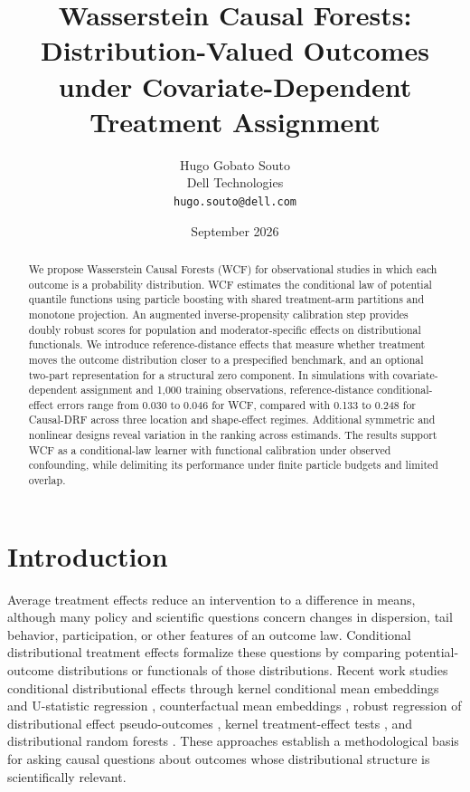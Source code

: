 \documentclass[11pt]{article}
\title{Wasserstein Causal Forests: Distribution-Valued Outcomes\\ under Covariate-Dependent Treatment Assignment}
\author{Hugo Gobato Souto\\ Dell Technologies\\ \texttt{hugo.souto@dell.com}}
\date{September 2026}
\begin{document}
\maketitle

\begin{abstract}
We propose Wasserstein Causal Forests (WCF) for observational studies in which each outcome is a probability distribution. WCF estimates the conditional law of potential quantile functions using particle boosting with shared treatment-arm partitions and monotone projection. An augmented inverse-propensity calibration step provides doubly robust scores for population and moderator-specific effects on distributional functionals. We introduce reference-distance effects that measure whether treatment moves the outcome distribution closer to a prespecified benchmark, and an optional two-part representation for a structural zero component. In simulations with covariate-dependent assignment and 1,000 training observations, reference-distance conditional-effect errors range from 0.030 to 0.046 for WCF, compared with 0.133 to 0.248 for Causal-DRF across three location and shape-effect regimes. Additional symmetric and nonlinear designs reveal variation in the ranking across estimands. The results support WCF as a conditional-law learner with functional calibration under observed confounding, while delimiting its performance under finite particle budgets and limited overlap.
\end{abstract}

\section{Introduction}\label{sec:intro}

Average treatment effects reduce an intervention to a difference in means, although many policy and scientific questions concern changes in dispersion, tail behavior, participation, or other features of an outcome law. Conditional distributional treatment effects formalize these questions by comparing potential-outcome distributions or functionals of those distributions. Recent work studies conditional distributional effects through kernel conditional mean embeddings and U-statistic regression \citep{CATEGeneralization}, counterfactual mean embeddings \citep{Counterfactualmeanembeddings}, robust regression of distributional effect pseudo-outcomes \citep{GRFDistributionalCausalEffects}, kernel treatment-effect tests \citep{martineztaboada2023efficient}, and distributional random forests \citep{DRF-paper,naf2026causaldrf}. These approaches establish a methodological basis for asking causal questions about outcomes whose distributional structure is scientifically relevant.
\end{document}
